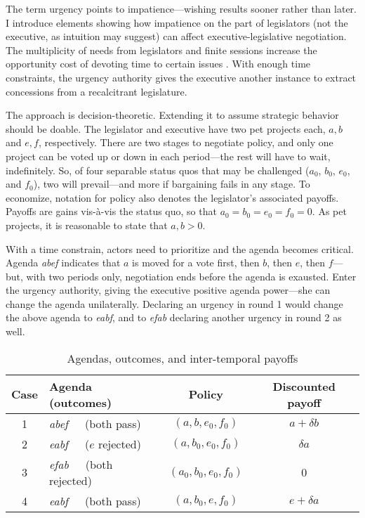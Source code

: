\documentclass[letter,12pt]{article}
\begin{document}
The term urgency points to impatience---wishing results sooner rather than later. I introduce elements showing how impatience on the part of legislators (not the executive, as intuition may suggest) can affect executive-legislative negotiation. The multiplicity of needs from legislators and finite sessions increase the opportunity cost of devoting time to certain issues \citep{fenno.1973}. With enough time constraints, the urgency authority gives the executive another instance to extract concessions from a recalcitrant legislature. 

The approach is decision-theoretic. Extending it to assume strategic behavior should be doable. The legislator and executive have two pet projects each, $a,b$ and $e,f$, respectively. There are two stages to negotiate policy, and only one project can be voted up or down in each period---the rest will have to wait, indefinitely. So, of four separable status quos that may be challenged ($a_0$, $b_0$, $e_0$, and $f_0$), two will prevail---and more if bargaining fails in any stage. To economize, notation for policy also denotes the legislator's associated payoffs. Payoffs are gains vis-\`a-vis the status quo, so that $a_0=b_0=e_0=f_0=0$. As pet projects, it is reasonable to state that $a,b>0$. 

With a time constrain, actors need to prioritize and the agenda becomes critical. Agenda \emph{abef} indicates that $a$ is moved for a vote first, then $b$, then $e$, then $f$---but, with two periods only, negotiation ends before the agenda is exausted. Enter the urgency authority, giving the executive positive agenda power---she can change the agenda unilaterally. Declaring an urgency in round 1 would change the above agenda to \emph{eabf}, and to \emph{efab} declaring another urgency in round 2 as well. 

\begin{table}
\centering
\begin{tabular}{clcc}
Case & Agenda (outcomes)           & Policy             &  Discounted payoff \\ \hline
1    & \emph{abef}~~~(both pass)     & $(a,b,e_0,f_0)$    &  $a + \delta b$    \\
2    & \emph{eabf}~~~($e$ rejected)  & $(a,b_0,e_0,f_0)$  &  $\delta a$        \\
3    & \emph{efab}~~~(both rejected) & $(a_0,b_0,e_0,f_0)$ &  0                 \\
4    & \emph{eabf}~~~(both pass)     & $(a,b_0,e,f_0)$    &  $e + \delta a$    \\  \hline
\end{tabular}
\caption{Agendas, outcomes, and inter-temporal payoffs}\label{T:agendaPayoffs}
\end{table}
\end{document}
